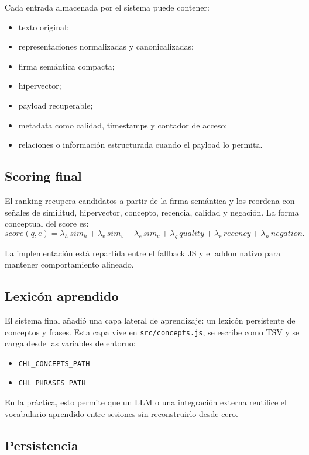 \documentclass[11pt]{article}
\begin{document}
Cada entrada almacenada por el sistema puede contener:
\begin{itemize}
  \item texto original;
  \item representaciones normalizadas y canonicalizadas;
  \item firma semántica compacta;
  \item hipervector;
  \item payload recuperable;
  \item metadata como calidad, timestamps y contador de acceso;
  \item relaciones o información estructurada cuando el payload lo permita.
\end{itemize}

\subsection{Scoring final}

El ranking recupera candidatos a partir de la firma semántica y los reordena con señales de similitud, hipervector, concepto, recencia, calidad y negación. La forma conceptual del score es:
\[
score(q,e)=\lambda_h \, sim_h + \lambda_v \, sim_v + \lambda_c \, sim_c + \lambda_q \, quality + \lambda_r \, recency + \lambda_n \, negation.
\]

La implementación está repartida entre el fallback JS y el addon nativo para mantener comportamiento alineado.

\subsection{Lexicón aprendido}

El sistema final añadió una capa lateral de aprendizaje: un lexicón persistente de conceptos y frases. Esta capa vive en \texttt{src/concepts.js}, se escribe como TSV y se carga desde las variables de entorno:
\begin{itemize}
  \item \texttt{CHL\_CONCEPTS\_PATH}
  \item \texttt{CHL\_PHRASES\_PATH}
\end{itemize}

En la práctica, esto permite que un LLM o una integración externa reutilice el vocabulario aprendido entre sesiones sin reconstruirlo desde cero.

\subsection{Persistencia}
\end{document}
